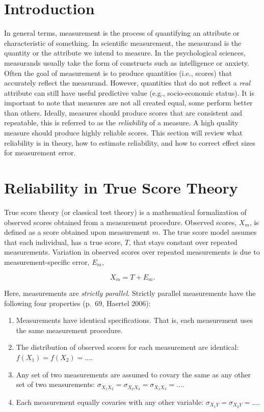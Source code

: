 \documentclass[
  letterpaper,
  DIV=11,
  numbers=noendperiod]{scrreprt}
\providecommand{\tightlist}{%
  \setlength{\itemsep}{0pt}\setlength{\parskip}{0pt}}\usepackage{longtable,booktabs,array}
\begin{document}
\hypertarget{introduction-1}{%
\section{Introduction}\label{introduction-1}}

In general terms, measurement is the process of quantifying an attribute
or characteristic of something. In scientific measurement, the measurand
is the quantity or the attribute we intend to measure. In the
psychological sciences, measurands usually take the form of constructs
such as intelligence or anxiety. Often the goal of measurement is to
produce quantities (i.e., scores) that accurately reflect the measurand.
However, quantities that do not reflect a \emph{real} attribute can
still have useful predictive value (e.g., socio-economic status). It is
important to note that measures are not all created equal, some perform
better than others. Ideally, measures should produce scores that are
consistent and repeatable, this is referred to as the \emph{reliability}
of a measure. A high quality measure should produce highly reliable
scores. This section will review what reliability is in theory, how to
estimate reliability, and how to correct effect sizes for measurement
error.

\hypertarget{sec-true-score-theory}{%
\section{Reliability in True Score Theory}\label{sec-true-score-theory}}

True score theory (or classical test theory) is a mathematical
formalization of observed scores obtained from a measurement procedure.
Observed scores, \(X_m\), is defined as a score obtained upon
measurement \(m\). The true score model assumes that each individual,
has a true score, \(T\), that stays constant over repeated measurements.
Variation in observed scores over repeated measurements is due to
measurement-specific error, \(E_{m}\),

\[
X_{m} = T+E_{m}.
\]

Here, measurements are \emph{strictly parallel}. Strictly parallel
measurements have the following four properties (p.~69, Haertel 2006):

\begin{enumerate}
\def\labelenumi{\arabic{enumi}.}
\tightlist
\item
  Measurements have identical specifications. That is, each measurement
  uses the same measurement procedure.
\item
  The distribution of observed scores for each measurement are
  identical: \(f(X_1) = f(X_2) = \ldots\).
\item
  Any set of two measurements are assumed to covary the same as any
  other set of two measurements:
  \(\sigma_{X_1 X_2} = \sigma_{X_2 X_3} = \sigma_{X_1 X_3} = \ldots\).
\item
  Each measurement equally covaries with any other variable:
  \(\sigma_{X_1 Y} = \sigma_{X_2 Y} = \ldots\).
\end{enumerate}
\end{document}
